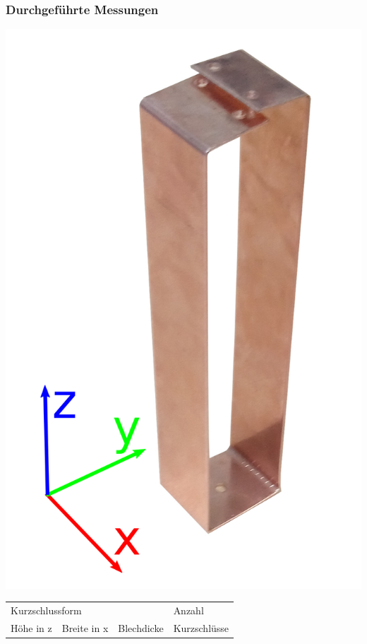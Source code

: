 \documentclass[accentcolor=tud9b, colorbacktitle, inverttitle]{tudbeamer}
\begin{document}
\begin{frame}\frametitle{Durchgef\"uhrte Messungen}
\vspace{-1em}
\begin{minipage}[t]{0.3\textwidth}
	\includegraphics[width=\textwidth]{KS}
\end{minipage}
\begin{minipage}[t]{0.6\textwidth}
\vspace{-0.75\textwidth}
	\begin{tabular}{ | l | l |  l | l | }
		\hline
		\multicolumn{3}{|l|}{Kurzschlussform} & Anzahl \\ \cline{0-2}
		H\"ohe in z & Breite in x & Blechdicke & Kurzschl\"usse \\\hline

\end{tabular}
\end{minipage}
\end{frame}
\end{document}
